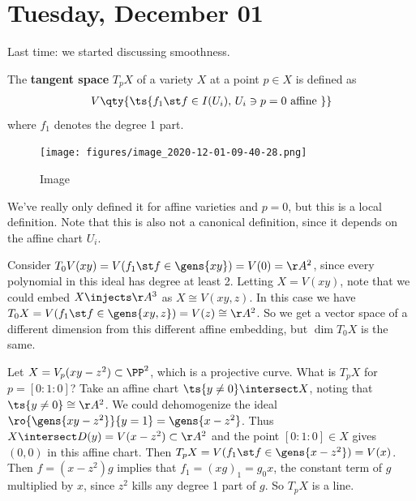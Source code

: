 \hypertarget{tuesday-december-01}{%
\section{Tuesday, December 01}\label{tuesday-december-01}}

Last time: we started discussing smoothness.

\begin{definition}

The \textbf{tangent space} \(T_p X\) of a variety \(X\) at a point
\(p\in X\) is defined as
\begin{align*}
V\qty{\ts{f_1 \st f\in I(U_i),\, U_i \ni p = 0 \text{ affine } }}
\end{align*} where \(f_1\) denotes the degree 1 part.

\begin{figure}
\centering
\texttt{[image: figures/image\_2020-12-01-09-40-28.png]}
\caption{Image}
\end{figure}

\end{definition}

\begin{remark}

We've really only defined it for affine varieties and \(p=0\), but this
is a local definition. Note that this is also not a canonical
definition, since it depends on the affine chart \(U_i\).

\end{remark}

\begin{example}[?]

Consider \(T_0 V(xy) = V(f_1 \st f\in \gens{xy}) = V(0) = \AA^2\), since
every polynomial in this ideal has degree at least 2. Letting
\(X = V(xy)\), note that we could embed \(X\injects \AA^3\) as
\(X\cong V(xy, z)\). In this case we have
\(T_0 X = V(f_1 \st f\in \gens{xy, z}) = V(z) \cong \AA^2\). So we get a
vector space of a different dimension from this different affine
embedding, but \(\dim T_0 X\) is the same.

\end{example}

\begin{example}[?]

Let \(X = V_p(xy-z^2) \subset \PP^2\), which is a projective curve. What
is \(T_p X\) for \(p = [0:1:0]\)? Take an affine chart
\(\ts{y\neq 0} \intersect X\), noting that \(\ts{y\neq 0} \cong \AA^2\).
We could dehomogenize the ideal
\(\ro{\gens{xy-z^2}}{y=1} = \gens{x-z^2}\). Thus
\(X \intersect D(y) = V(x-z^2) \subset \AA^2\) and the point
\([0:1:0] \in X\) gives \((0, 0)\) in this affine chart. Then
\(T_p X = V(f_1 \st f\in \gens{x-z^2}) = V(x)\). Then \(f = (x-z^2)g\)
implies that \(f_1 = (xg)_1 = g_0 x\), the constant term of \(g\)
multiplied by \(x\), since \(z^2\) kills any degree 1 part of \(g\). So
\(T_p X\) is a line.

\end{example}

